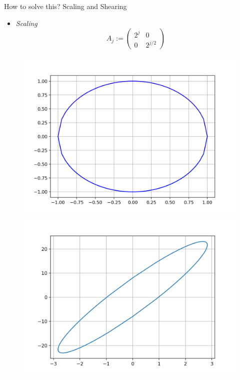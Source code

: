 \begin{frame}{How to solve this? Scaling and Shearing}

\begin{minipage}{0.25\textwidth}
\begin{itemize}
\item\textit{Scaling}
$$
A_j:=
\left(
\begin{matrix}
2^j & 0 \\
0 & 2^{j/2}
\end{matrix}
\right)
$$
\end{itemize}
\end{minipage}  \hfill
\pause
\begin{minipage}{0.65\textwidth}
\begin{figure}[!tbp]
  \centering
  \begin{minipage}[b]{0.45\textwidth}
    \includegraphics[width=\textwidth]{./Images/circle.png}
  \end{minipage}
	\pause
 \hfill 
  \begin{minipage}[b]{0.45\textwidth}
    \includegraphics[width=\textwidth]{./Images/circle_scaled.png}
  \end{minipage}
\end{figure}
\end{minipage}


\end{frame}

